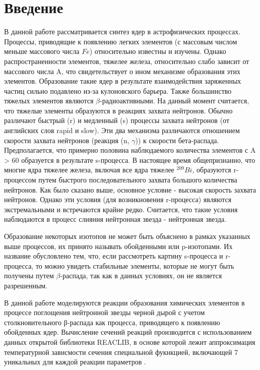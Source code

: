 \documentclass[14pt, a4paper]{article}
\numberwithin{figure}{section}
\numberwithin{equation}{section}
\begin{document}
\tableofcontents
\section*{\centering Введение}
В данной работе рассматривается синтез ядер в астрофизических процессах. Процессы, приводящие к появлению легких элементов (с массовым числом меньше массового числа $Fe$) относительно известны и изучены. Однако распространенности элементов, тяжелее железа, относительно слабо зависит от массового числа A, что свидетельствует о ином механизме образования этих элементов. Образование такие ядер в результате взаимодействия заряженных частиц сильно подавлено из-за кулоновского барьера. Также большинство тяжелых элементов являются $\beta$-радиоактивными. На данный момент считается, что тяжелые элементы образуются в реакциях захвата нейтронов. Обычно различают быстрый (r) и медленный (s) процессы захвата нейтронов (от английских слов rapid и slow). Эти два механизма различаются отношением скорости захвата нейтронов (реакция (n, $\gamma$)) к скорости бета-распада. Предполагается, что примерно половина наблюдаемого количества элементов с A > 60 образуется в результате s-процесса. В настоящее время общепризнанно, что многие ядра тяжелее железа, включая все ядра тяжелее $^{209}Bi$, образуются r-процессом путем быстрого последовательного захвата большого количества нейтронов. Как было сказано выше, основное условие - высокая скорость захвата нейтронов. Однако эти условия (для возникновения r-процесса) являются экстремальными и встречаются крайне редко.  Считается, что такие условия наблюдаются в процесс слияния нейтронная звезда - нейтронная звезда.

Образование некоторых изотопов не может быть объяснено в рамках указанных выше процессов, их принято называть обойденными или p-изо\-то\-па\-ми. Их название обусловлено тем, что, если рассмотреть картину s-процесса и r-процесса, то можно увидеть стабильные элементы, которые не могут быть получены путем $\beta$-распада, так как в данных условиях, он не является разрешенным.

В данной работе моделируются реакции образования химических элементов в процессе поглощения нейтронной звезды черной дырой \cite{bhns1} с учетом столкновительного β-распада как процесса, приводящего к появлению обойденных ядер. Вычисление сечений реакций производится с использованием данных открытой библиотеки REACLIB, в основе которой лежит аппроксимация температурной зависмости сечения специальной фукнкцией, включающей 7 уникальных для каждой реакции параметров \cite{jina}.
\end{document}
